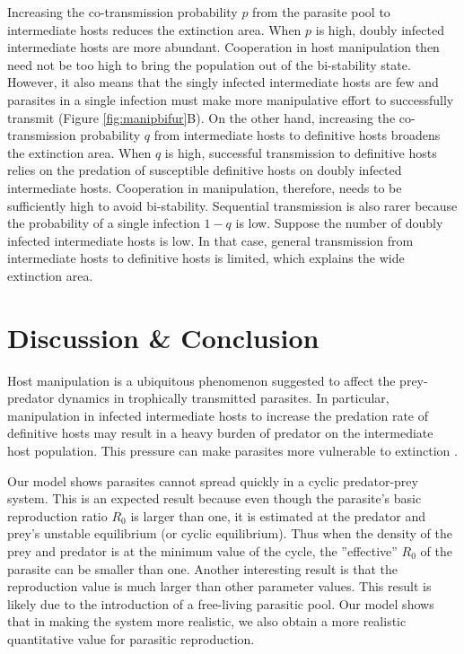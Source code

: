 \documentclass[11pt]{article}
\begin{document}
Increasing the co-transmission probability $p$ from the parasite pool to intermediate hosts reduces the extinction area. 
When $p$ is high, doubly infected intermediate hosts are more abundant. Cooperation in host manipulation then need not be too high to bring the population out of the bi-stability state. 
However, it also means that the singly infected intermediate hosts are few and parasites in a single infection must make more manipulative effort to successfully transmit (Figure \ref{fig:manipbifur}B). 
On the other hand, increasing the co-transmission probability $q$ from intermediate hosts to definitive hosts broadens the extinction area. 
When $q$ is high, successful transmission to definitive hosts relies on the predation of susceptible definitive hosts on doubly infected intermediate hosts. 
Cooperation in manipulation, therefore, needs to be sufficiently high to avoid bi-stability. 
Sequential transmission is also rarer because the probability of a single infection $1-q$ is low. 
Suppose the number of doubly infected intermediate hosts is low. 
In that case, general transmission from intermediate hosts to definitive hosts is limited, which explains the wide extinction area.

\section*{Discussion \& Conclusion}
Host manipulation is a ubiquitous phenomenon suggested to affect the prey-predator dynamics in trophically transmitted parasites. 
In particular, manipulation in infected intermediate hosts to increase the predation rate of definitive hosts may result in a heavy burden of predator on the intermediate host population.
This pressure can make parasites more vulnerable to extinction \citep{Hadeler1989,Fenton2006}. 

Our model shows parasites cannot spread quickly in a cyclic predator-prey system. 
This is an expected result because even though the parasite's basic reproduction ratio $R_0$ is larger than one, it is estimated at the predator and prey's unstable equilibrium (or cyclic equilibrium). 
Thus when the density of the prey and predator is at the minimum value of the cycle, the ''effective'' $R_0$ of the parasite can be smaller than one. 
Another interesting result is that the reproduction value is much larger than other parameter values.
This result is likely due to the introduction of a free-living parasitic pool. Our model shows that in making the system more realistic, we also obtain a more realistic quantitative value for parasitic reproduction.
\end{document}
